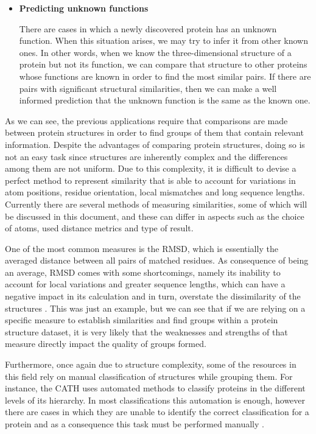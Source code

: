 \begin{itemize}
\item \textbf{Predicting unknown functions}

There are cases in which a newly discovered protein has an unknown function. When this situation arises, we may try to infer it from other known ones. In other words, when we know the three-dimensional structure of a protein but not its function, we can compare that structure to other proteins whose functions are known in order to find the most similar pairs. If there are pairs with significant structural similarities, then we can make a well informed prediction that the unknown function is the same as the known one. 
\end{itemize}

As we can see, the previous applications require that comparisons are made between protein structures in order to find groups of them that contain relevant information. Despite the advantages of comparing protein structures, doing so is not an easy task since structures are inherently complex and the differences among them are not uniform. Due to this complexity, it is difficult to devise a perfect method to represent similarity that is able to account for variations in atom positions, residue orientation, local mismatches and long sequence lengths. Currently there are several methods of measuring similarities, some of which will be discussed in this document, and these can differ in aspects such as the choice of atoms, used distance metrics and type of result.

One of the most common measures is the \gls{RMSD}, which is essentially the averaged distance between all pairs of matched residues. As consequence of being an average, RMSD comes with some shortcomings, namely its inability to account for local variations and greater sequence lengths, which can have a negative impact in its calculation and in turn, overstate the dissimilarity of the structures \cite{li2013difficulty}. This was just an example, but we can see that if we are relying on a specific measure to establish similarities and find groups within a protein structure dataset, it is very likely that the weaknesses and strengths of that measure directly impact the quality of groups formed.

Furthermore, once again due to structure complexity, some of the resources in this field rely on manual classification of structures while grouping them. For instance, the \gls{CATH} uses automated methods to classify proteins in the different levels of its hierarchy. In most classifications this automation is enough, however there are cases in which they are unable to identify the correct classification for a protein and as a consequence this task must be performed manually \cite{knudsen2010cath}.

